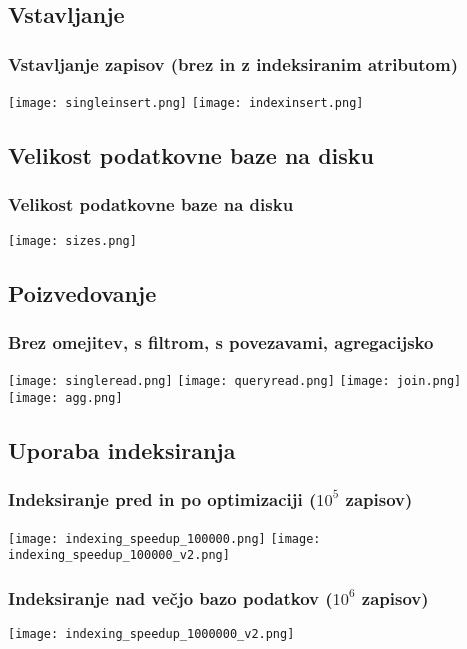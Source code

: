 \documentclass{beamer}
\begin{document}
    \subsection{Vstavljanje}
    \begin{frame}
        \frametitle{Vstavljanje zapisov (brez in z indeksiranim atributom)}
            \centering
            \texttt{[image: singleinsert.png]}
            \vline
            \texttt{[image: indexinsert.png]}
    \end{frame}

    \subsection{Velikost podatkovne baze na disku}
    \begin{frame}
        \frametitle{Velikost podatkovne baze na disku}
            \centering
            \texttt{[image: sizes.png]}
    \end{frame}

    \subsection{Poizvedovanje}
    \begin{frame}
        \frametitle{Brez omejitev, s filtrom, s povezavami, agregacijsko}
        \texttt{[image: singleread.png]}
        \texttt{[image: queryread.png]}
        \hline
        \texttt{[image: join.png]}
        \texttt{[image: agg.png]}
    \end{frame}

    \subsection{Uporaba indeksiranja}
    \begin{frame}
        \frametitle{Indeksiranje pred in po optimizaciji ($10^5$ zapisov)}
            \centering
            \texttt{[image: indexing\_speedup\_100000.png]}
            \vline
            \texttt{[image: indexing\_speedup\_100000\_v2.png]}
    \end{frame}

    \begin{frame}
        \frametitle{Indeksiranje nad večjo bazo podatkov ($10^6$ zapisov)}
            \centering
            \texttt{[image: indexing\_speedup\_1000000\_v2.png]}
    \end{frame}
\end{document}
